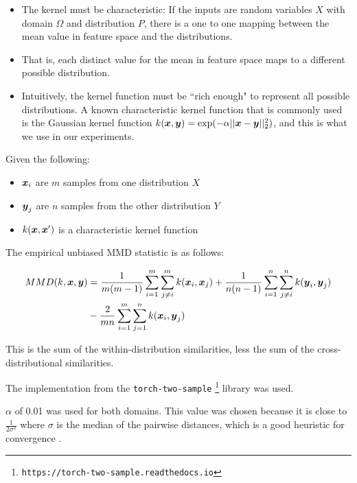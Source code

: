 \begin{itemize}
    \item The kernel must be characteristic: If the inputs are random variables $X$ with domain $\Omega$ and distribution $P$, there is a one to one mapping between the mean value in feature space and the distributions. \cite{KernelMeanEmbeddingReview} 
    \item That is, each distinct value for the mean in feature space maps to a different possible distribution. 
    \item Intuitively, the kernel function must be ``rich enough" to represent all possible distributions. A known characteristic kernel function that is commonly used is the Gaussian kernel function $k(\boldsymbol{x}, \boldsymbol{y}) = \exp(-\alpha ||\boldsymbol{x} - \boldsymbol{y}||_2^2)$, and this is what we use in our experiments. 
\end{itemize}

Given the following:

\begin{itemize}
    \item $\boldsymbol{x}_i$ are $m$ samples from one distribution  $X$
    \item $\boldsymbol{y}_j$ are $n$ samples from the other distribution $Y$
    \item $k(\boldsymbol{x}, \boldsymbol{x}')$ is a characteristic kernel function
\end{itemize}

The empirical unbiased MMD statistic is as follows:

\begin{equation*}
\label{eq:mmd}
\begin{split}
MMD (k, \boldsymbol{x}, \boldsymbol{y}) &= \frac{1}{m(m-1)} \sum_{i=1}^m \sum_{j \neq i}^m k(\boldsymbol{x}_i, \boldsymbol{x}_j) + \frac{1}{n(n-1)} \sum_{i=1}^n \sum_{j \neq i}^n k(\boldsymbol{y}_i, \boldsymbol{y}_j) \\
&- \frac{2}{mn} \sum_{i=1}^m \sum_{j=1}^n k(\boldsymbol{x}_i, \boldsymbol{y}_j)
\end{split}
\end{equation*}

This is the sum of the within-distribution similarities, less the sum of the cross-distributional similarities. 


The implementation from the \texttt{torch-two-sample} \footnote{\texttt{https://torch-two-sample.readthedocs.io}} library \cite{torchtwosample} was used.

$\alpha$ of 0.01 was used for both domains. This value was chosen because it is close to $\frac{1}{2 \sigma^2}$ where $\sigma$ is the median of the pairwise distances, which is a good heuristic for convergence \cite{Garreau2017LargeSA} .  

